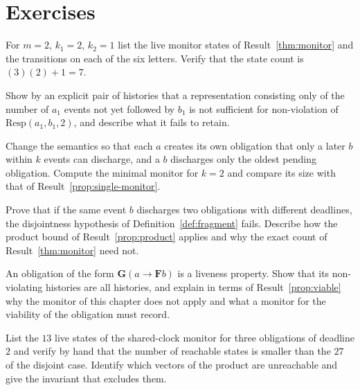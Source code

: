\section*{Exercises}

\begin{exercise}
For $m=2$, $k_1=2$, $k_2=1$ list the live monitor states of Result~\ref{thm:monitor} and the transitions on each of the six letters. Verify that the state count is $(3)(2)+1=7$.
\end{exercise}

\begin{exercise}
Show by an explicit pair of histories that a representation consisting only of the number of $a_1$ events not yet followed by $b_1$ is not sufficient for non-violation of $\mathrm{Resp}(a_1,b_1,2)$, and describe what it fails to retain.
\end{exercise}

\begin{exercise}
Change the semantics so that each $a$ creates its own obligation that only a later $b$ within $k$ events can discharge, and a $b$ discharges only the oldest pending obligation. Compute the minimal monitor for $k=2$ and compare its size with that of Result~\ref{prop:single-monitor}.
\end{exercise}

\begin{exercise}
Prove that if the same event $b$ discharges two obligations with different deadlines, the disjointness hypothesis of Definition~\ref{def:fragment} fails. Describe how the product bound of Result~\ref{prop:product} applies and why the exact count of Result~\ref{thm:monitor} need not.
\end{exercise}

\begin{exercise}
An obligation of the form $\mathbf G(a\to\mathbf F b)$ is a liveness property. Show that its non-violating histories are all histories, and explain in terms of Result~\ref{prop:viable} why the monitor of this chapter does not apply and what a monitor for the viability of the obligation must record.
\end{exercise}


\begin{exercise}
List the $13$ live states of the shared-clock monitor for three obligations of deadline $2$ and verify by hand that the number of reachable states is smaller than the $27$ of the disjoint case. Identify which vectors of the product are unreachable and give the invariant that excludes them.\label{ex:thirteen}
\end{exercise}

